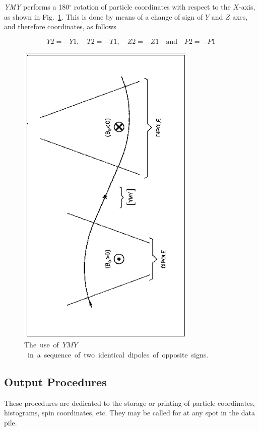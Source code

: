 {\textsl{YMY}  performs a 180$^\circ$ rotation of particle coordinates with respect to the 
$ X $-axis, as shown  in Fig.~\ref{fig33}. 
This is done by means of a change of sign of $ Y $ and $ Z $ axes,  
and therefore coordinates, as follows 

$$ Y2=-Y1,\quad T2=-T1,\quad Z2=-Z1 \quad \text{and} \quad P2=-P1 $$

\vfill
\begin{figure}[H]
\centerline{\includegraphics[height=15cm,angle=-90]{Fig33.ps}}
\caption{\label{fig33}\mbox{The use of $ YMY $ in a sequence of two identical
dipoles of opposite signs.}}
\end{figure}
\vfill






\newpage  %

\subsection{Output Procedures} \label{sec4.5}

 These procedures are dedicated to the storage or printing of particle coordinates, 
histograms, spin coordinates, etc. They may be called for at any spot in the data pile. 





}
